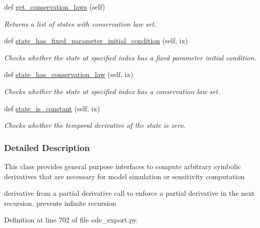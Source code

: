 \begin{DoxyCompactItemize}
def \mbox{\hyperlink{classamici_1_1ode__export_1_1_o_d_e_model_acbd9a0c022a1b5cbc09848bcac0de613}{get\+\_\+conservation\+\_\+laws}} (self)
\begin{DoxyCompactList}\small\item\em Returns a list of states with conservation law set. \end{DoxyCompactList}\item 
def \mbox{\hyperlink{classamici_1_1ode__export_1_1_o_d_e_model_a8b62416531adca2210c28230350b787e}{state\+\_\+has\+\_\+fixed\+\_\+parameter\+\_\+initial\+\_\+condition}} (self, ix)
\begin{DoxyCompactList}\small\item\em Checks whether the state at specified index has a fixed parameter initial condition. \end{DoxyCompactList}\item 
def \mbox{\hyperlink{classamici_1_1ode__export_1_1_o_d_e_model_a6c2d3ae2fc4dc74b8fba88db41ed8fae}{state\+\_\+has\+\_\+conservation\+\_\+law}} (self, ix)
\begin{DoxyCompactList}\small\item\em Checks whether the state at specified index has a conservation law set. \end{DoxyCompactList}\item 
def \mbox{\hyperlink{classamici_1_1ode__export_1_1_o_d_e_model_a5d453b4edf6d9cd24e024841a0cd70c6}{state\+\_\+is\+\_\+constant}} (self, ix)
\begin{DoxyCompactList}\small\item\em Checks whether the temporal derivative of the state is zero. \end{DoxyCompactList}\end{DoxyCompactItemize}


\subsubsection{Detailed Description}
This class provides general purpose interfaces to compute arbitrary symbolic derivatives that are necessary for model simulation or sensitivity computation

\begin{DoxyVerb}    derivative from a partial derivative call to enforce a partial
    derivative in the next recursion. prevents infinite recursion
\end{DoxyVerb}
 

Definition at line 702 of file ode\+\_\+export.\+py.



